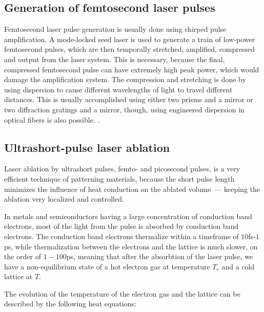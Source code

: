     \subsection{Generation of femtosecond laser pulses}
            Femtosecond laser pulse generation is usually done using chirped pulse amplification. A mode-locked seed laser is used
        to generate a train of low-power femtosecond pulses, which are then temporally stretched, amplified, compressed and output
        from the laser system. This is necessary, because the final, compressed femtosecond pulse can have extremely high peak power,
        which would damage the amplification system\cite{harilal2014femtosecond}.
            The compression and stretching is done by using dispersion to cause different wavelengths of light to travel different distances.
        This is usually accomplished using either two prisms and a mirror or two diffraction gratings and a mirror, though, using engineered
        dispersion in optical fibers is also possible\cite{harilal2014femtosecond}.
            .

    \subsection{Ultrashort-pulse laser ablation}
            Laser ablation by ultrashort pulses, femto- and picosecond pulses, is a very efficient technique of patterning materials, because
        the short pulse length minimizes the influence of heat conduction on the ablated volume~--- keeping the ablation very localized and
        controlled.

            In metals and semiconductors having a large concentration of conduction band electrons, most of the light from the pulse is
        absorbed by conduction band electrons. The conduction band electrons thermalize within a timeframe of $10$fs-$1$ps, while thermalization
        between the electrons and the lattice is much slower, on the order of $1-100$ps, meaning that after the absorbtion of the laser pulse,
        we have a non-equilibrium state of a hot electron gas at temperature $T_e$ and a cold lattice at $T$. \cite{bauerle2013laser}

        The evolution of the temperature of the electron gas and the lattice can be described by the following heat equations:

